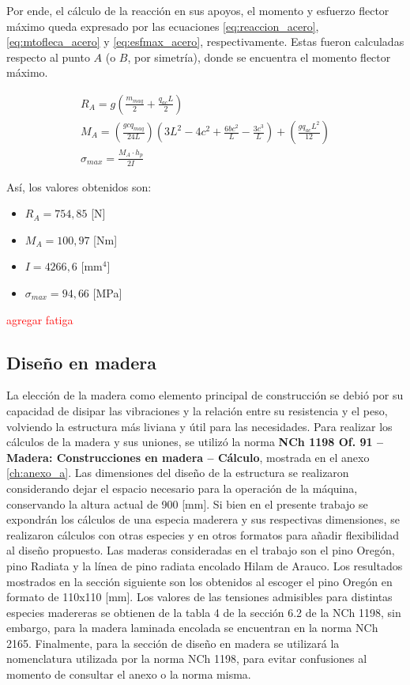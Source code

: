 Por ende, el cálculo de la reacción en sus apoyos, el momento y esfuerzo flector máximo queda expresado por las ecuaciones \ref{eq:reaccion_acero}, \ref{eq:mtofleca_acero} y \ref{eq:esfmax_acero}, respectivamente. Estas fueron calculadas respecto al punto $A$ (o $B$, por simetría), donde se encuentra el momento flector máximo.

\begin{subequations}
	\begin{gather}
		R_A = g\left(\frac{m_{maq}}{2} + \frac{q_{ac}L}{2}\right) \label{eq:reaccion_acero}\\ 
		M_A = \left(\frac{gcq_{maq}}{24L}\right) \left(3L^2 - 4c^2 + \frac{6bc^2}{L} - \frac{3c^3}{L}\right) + \left(\frac{gq_{ac}L^2}{12}\right) \label{eq:mtofleca_acero} \\
		\sigma_{max} = \frac{M_A \cdot h_p}{2I} \label{eq:esfmax_acero}
	\end{gather}
\end{subequations}

Así, los valores obtenidos son:
\begin{itemize}
	\item $R_A = 754,85$ [N]
	\item $M_A = 100,97$ [Nm]
	\item $I = 4266,6$ [mm$^4$]
	\item $\sigma_{max} = 94,66$ [MPa]
\end{itemize}

\textcolor{red}{agregar fatiga}

\subsection{Diseño en madera}
La elección de la madera como elemento principal de construcción se debió por su capacidad de disipar las vibraciones y la relación entre su resistencia y el peso, volviendo la estructura más liviana y útil para las necesidades. Para realizar los cálculos de la madera y sus uniones, se utilizó la norma \textbf{NCh 1198 Of. 91 -- Madera: Construcciones en madera -- Cálculo}, mostrada en el anexo \ref{ch:anexo_a}. Las dimensiones del diseño de la estructura se realizaron considerando dejar el espacio necesario para la operación de la máquina, conservando la altura actual de 900 [mm]. Si bien en el presente trabajo se expondrán los cálculos de una especia maderera y sus respectivas dimensiones, se realizaron cálculos con otras especies y en otros formatos para añadir flexibilidad al diseño propuesto. Las maderas consideradas en el trabajo son el pino Oregón, pino Radiata y la línea de pino radiata encolado Hilam de Arauco. Los resultados mostrados en la sección siguiente son los obtenidos al escoger el pino Oregón en formato de 110x110 [mm]. Los valores de las tensiones admisibles para distintas especies madereras se obtienen de la tabla 4 de la sección 6.2 de la NCh 1198, sin embargo, para la madera laminada encolada se encuentran en la norma NCh 2165. Finalmente, para la sección de diseño en madera se utilizará la nomenclatura utilizada por la norma NCh 1198, para evitar confusiones al momento de consultar el anexo o la norma misma.

